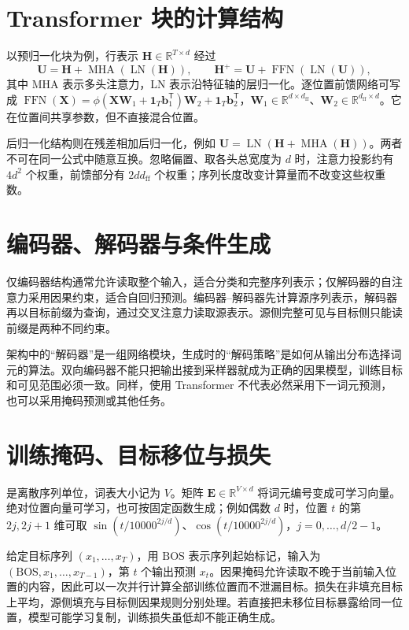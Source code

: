 \documentclass[UTF8,12pt,a4paper,fontset=fandol]{ctexbook}
\begin{document}
\section{Transformer 块的计算结构}
以预归一化块为例，行表示 $\mathbf H\in\mathbb R^{T\times d}$ 经过
\begin{equation}
\mathbf U=\mathbf H+\operatorname{MHA}(\operatorname{LN}(\mathbf H)),\qquad
\mathbf H^+=\mathbf U+\operatorname{FFN}(\operatorname{LN}(\mathbf U)),
\label{eq:dl-transformer-block}
\end{equation}
其中 MHA 表示多头注意力，LN 表示沿特征轴的层归一化。逐位置前馈网络可写成 $\operatorname{FFN}(\mathbf X)=\phi(\mathbf X\mathbf W_1+\mathbf1_T\mathbf b_1^\mathsf T)\mathbf W_2+\mathbf1_T\mathbf b_2^\mathsf T$，$\mathbf W_1\in\mathbb R^{d\times d_{\mathrm{ff}}}$、$\mathbf W_2\in\mathbb R^{d_{\mathrm{ff}}\times d}$。它在位置间共享参数，但不直接混合位置。

后归一化结构则在残差相加后归一化，例如 $\mathbf U=\operatorname{LN}(\mathbf H+\operatorname{MHA}(\mathbf H))$。两者不可在同一公式中随意互换。忽略偏置、取各头总宽度为 $d$ 时，注意力投影约有 $4d^2$ 个权重，前馈部分有 $2dd_{\mathrm{ff}}$ 个权重；序列长度改变计算量而不改变这些权重数。

\section{编码器、解码器与条件生成}
仅编码器结构通常允许读取整个输入，适合分类和完整序列表示；仅解码器的自注意力采用因果约束，适合自回归预测。编码器--解码器先计算源序列表示，解码器再以目标前缀为查询，通过交叉注意力读取源表示。源侧完整可见与目标侧只能读前缀是两种不同约束。

架构中的“解码器”是一组网络模块，生成时的“解码策略”是如何从输出分布选择词元的算法。双向编码器不能只把输出接到采样器就成为正确的因果模型，训练目标和可见范围必须一致。同样，使用 Transformer 不代表必然采用下一词元预测，也可以采用掩码预测或其他任务。

\section{训练掩码、目标移位与损失}
是离散序列单位，词表大小记为 $V$。矩阵 $\mathbf E\in\mathbb R^{V\times d}$ 将词元编号变成可学习向量。绝对位置向量可学习，也可按固定函数生成；例如偶数 $d$ 时，位置 $t$ 的第 $2j,2j+1$ 维可取 $\sin(t/10000^{2j/d})$、$\cos(t/10000^{2j/d})$，$j=0,\ldots,d/2-1$。

给定目标序列 $(x_1,\ldots,x_T)$，用 $\mathrm{BOS}$ 表示序列起始标记，输入为 $(\mathrm{BOS},x_1,\ldots,x_{T-1})$，第 $t$ 个输出预测 $x_t$。因果掩码允许读取不晚于当前输入位置的内容，因此可以一次并行计算全部训练位置而不泄漏目标。损失在非填充目标上平均，源侧填充与目标侧因果规则分别处理。若直接把未移位目标暴露给同一位置，模型可能学习复制，训练损失虽低却不能正确生成。
\end{document}
